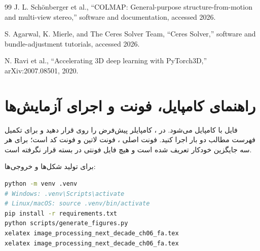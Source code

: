 \documentclass[12pt,openany,oneside]{book}
\begin{document}
\begin{latin}
\begin{thebibliography}{99}
J. L. Schönberger et al.,
``COLMAP: General-purpose structure-from-motion and multi-view stereo,''
software and documentation, accessed 2026.

S. Agarwal, K. Mierle, and The Ceres Solver Team,
``Ceres Solver,'' software and bundle-adjustment tutorials, accessed 2026.

N. Ravi et al.,
``Accelerating 3D deep learning with PyTorch3D,''
arXiv:2007.08501, 2020.

\end{thebibliography}
\end{latin}

\chapter*{راهنمای کامپایل، فونت و اجرای آزمایش‌ها}

فایل با  کامپایل می‌شود. در ، کامپایلر پیش‌فرض را روی  قرار دهید و برای تکمیل
فهرست مطالب دو بار اجرا کنید. فونت اصلی ، فونت لاتین  و فونت کد
 است؛ برای هر سه جایگزین خودکار تعریف شده است و هیچ فایل فونتی در بسته قرار نگرفته است.

برای تولید شکل‌ها و خروجی‌ها:
\begin{latin}
\begin{lstlisting}[language=bash]
python -m venv .venv
# Windows: .venv\Scripts\activate
# Linux/macOS: source .venv/bin/activate
pip install -r requirements.txt
python scripts/generate_figures.py
xelatex image_processing_next_decade_ch06_fa.tex
xelatex image_processing_next_decade_ch06_fa.tex
\end{lstlisting}
\end{latin}
\end{document}
